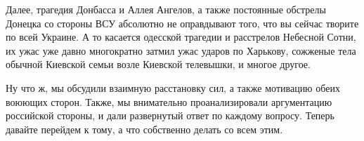 Далее, трагедия Донбасса и Аллея Ангелов, а также постоянные обстрелы Донецка
со стороны ВСУ абсолютно не оправдывают того, что вы сейчас творите по всей
Украине. А то касается одесской трагедии и расстрелов Небесной Сотни, их ужас
уже давно многократно затмил ужас ударов по Харькову, сожженые тела обычной
Киевской семьи возле Киевской телевышки, и многое другое.

Ну что ж, мы обсудили взаимную расстановку сил, а также мотивацию обеих воюющих
сторон.  Также, мы внимательно проанализировали аргументацию российской
стороны, и дали развернутый ответ по каждому вопросу. Теперь давайте перейдем к
тому, а что собственно делать со всем этим.
